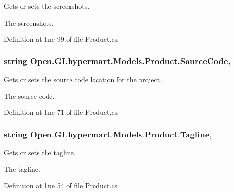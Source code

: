 Gets or sets the screenshots. 

The screenshots. 

Definition at line 99 of file Product.\+cs.

\hypertarget{class_open_1_1_g_i_1_1hypermart_1_1_models_1_1_product_ab5fd5620220d0e68053208859137a6cb}{}
\subsubsection[{Source\+Code}]{\setlength{\rightskip}{0pt plus 5cm}string Open.\+G\+I.\+hypermart.\+Models.\+Product.\+Source\+Code\hspace{0.3cm}{\ttfamily [get]}, {\ttfamily [set]}}\label{class_open_1_1_g_i_1_1hypermart_1_1_models_1_1_product_ab5fd5620220d0e68053208859137a6cb}


Gets or sets the source code location for the project. 

The source code. 

Definition at line 71 of file Product.\+cs.

\hypertarget{class_open_1_1_g_i_1_1hypermart_1_1_models_1_1_product_ad0233eb35ac4048277a4eafde6432c43}{}
\subsubsection[{Tagline}]{\setlength{\rightskip}{0pt plus 5cm}string Open.\+G\+I.\+hypermart.\+Models.\+Product.\+Tagline\hspace{0.3cm}{\ttfamily [get]}, {\ttfamily [set]}}\label{class_open_1_1_g_i_1_1hypermart_1_1_models_1_1_product_ad0233eb35ac4048277a4eafde6432c43}


Gets or sets the tagline. 

The tagline. 

Definition at line 54 of file Product.\+cs.

\hypertarget{class_open_1_1_g_i_1_1hypermart_1_1_models_1_1_product_a877241a61c423e91b6b630df5ca811d0}{}
